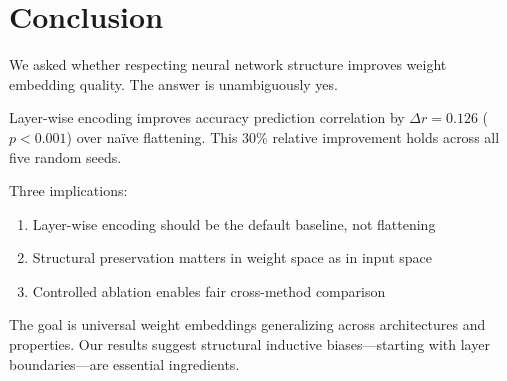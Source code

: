 \section{Conclusion}
\label{sec:conclusion}

We asked whether respecting neural network structure improves weight embedding quality. The answer is unambiguously yes.

Layer-wise encoding improves accuracy prediction correlation by $\Delta r = 0.126$ ($p < 0.001$) over na\"ive flattening. This 30\% relative improvement holds across all five random seeds.

Three implications:
\begin{enumerate}
    \item Layer-wise encoding should be the default baseline, not flattening
    \item Structural preservation matters in weight space as in input space
    \item Controlled ablation enables fair cross-method comparison
\end{enumerate}

The goal is universal weight embeddings generalizing across architectures and properties. Our results suggest structural inductive biases---starting with layer boundaries---are essential ingredients.
